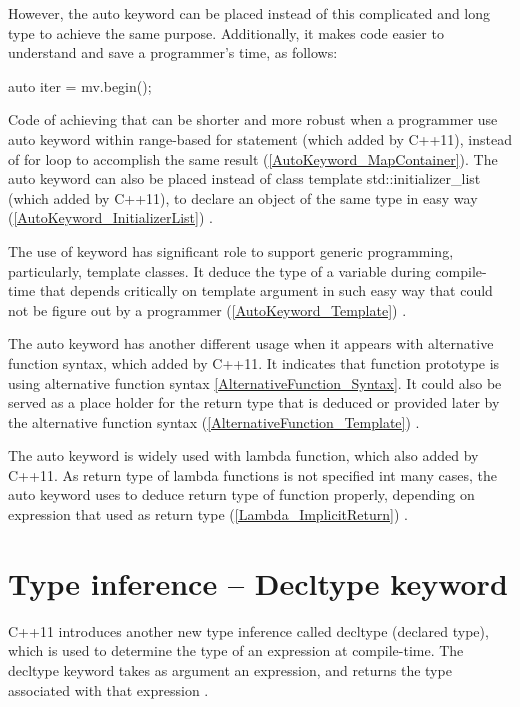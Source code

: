 \documentclass[11pt]{report}
\begin{document}
However, the auto keyword can be placed instead of this complicated and long type to achieve the same purpose. Additionally, it makes code easier to understand and save a programmer's time, as follows:

\begin{center}
auto iter = mv.begin();
\end{center}

Code of achieving that can be shorter and more robust when a programmer use auto keyword within range-based for statement (which added by C++11), instead of for loop to accomplish the same result (\ref{AutoKeyword_MapContainer}). The auto keyword can also be placed instead of class template std::initializer\_list (which added by C++11), to declare an object of the same type in easy way (\ref{AutoKeyword_InitializerList}) \cite{Gregorie:professionalcpp}.


The use of keyword has significant role to support generic programming, particularly, template classes. It deduce the type of a variable  during compile- time that depends critically on template argument in such easy way that could not be figure out by a programmer (\ref{AutoKeyword_Template}) \cite{Stroustrup:2012:Cpp11}.


The auto keyword has another different usage when it appears with alternative function syntax, which added by C++11. It indicates that function prototype is using alternative function syntax \ref{AlternativeFunction_Syntax}. It could also be served as a place holder for the return type that is deduced or provided later by the alternative function syntax (\ref{AlternativeFunction_Template}) \cite{Prata:2012:Cpp}.


The auto keyword is widely used with lambda function, which also added by C++11. As return type of lambda functions is not specified int many cases, the auto keyword uses to deduce return type of function properly, depending on expression that used as return type (\ref{Lambda_ImplicitReturn}) \cite{Gregorie:professionalcpp}.

\section{Type inference – Decltype keyword}
\label{section: Decltype keyword}
C++11 introduces another new type inference called decltype (declared type), which is used to determine the type of an expression at compile-time. The decltype keyword takes as argument an expression, and returns the type associated with that expression \cite{Stroustrup:2012:Cpp11}. 
\end{document}
